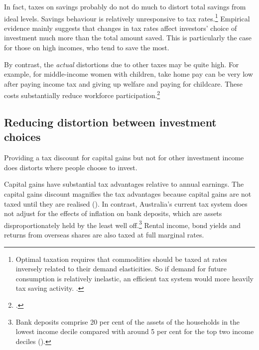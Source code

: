 In fact, taxes on savings probably do not do much to distort total savings from ideal levels. Savings behaviour is relatively unresponsive to tax rates.\footnote{Optimal taxation requires that commodities should be taxed at rates inversely related to their demand elasticities. So if demand for future consumption is relatively inelastic, an efficient tax system would more heavily tax saving activity. \textcite[See:][21--22]{Ingles2015}.}  Empirical evidence mainly suggests that changes in tax rates affect investors’ choice of investment much more than the total amount saved. This is particularly the case for those on high incomes, who tend to save the most.

By contrast, the \emph{actual} distortions due to other taxes may be quite high. For example, for middle-income women with children, take home pay can be very low after paying income tax and giving up welfare and paying for childcare. These costs substantially reduce workforce participation.\footcite[44--47]{DaleyMcGannonGinnivan2012}

\subsection{Reducing distortion between investment choices}\label{subsubsec:reducing-distortion-between-investment-choices}
Providing a tax discount for capital gains but not for other investment income does distorts where people choose to invest. 

Capital gains have substantial tax advantages relative to annual earnings. The capital gains discount magnifies the tax advantages because capital gains are not taxed until they are realised (). In contrast, Australia’s current tax system does not adjust for the effects of inflation on bank deposits, which are assets disproportionately held by the least well off.\footnote{Bank deposits comprise 20 per cent of the assets of the households in the lowest income decile compared with around 5 per cent for the top two income deciles (\textcite{HILDA2015}).}  Rental income, bond yields and returns from overseas shares are also taxed at full marginal rates. 


